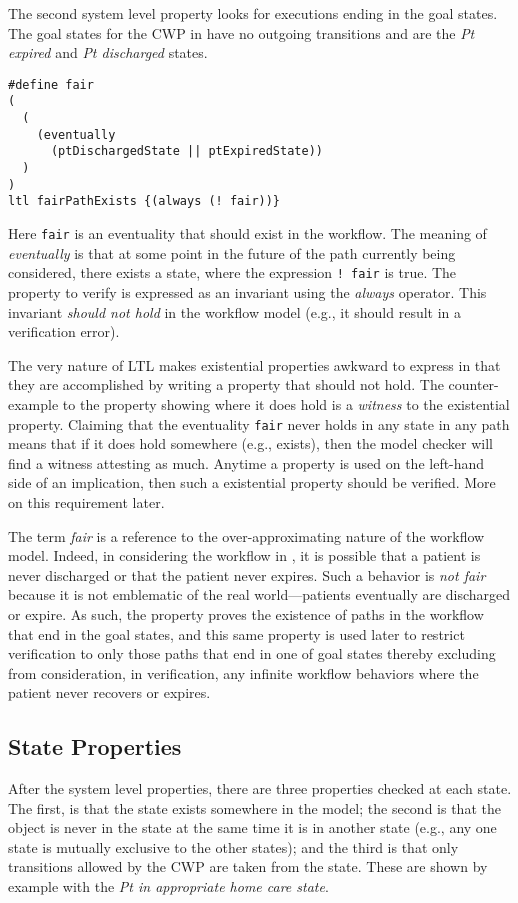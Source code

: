 The second system level property looks for executions ending in the goal states. The goal states for the CWP in  have no outgoing transitions and are the \emph{Pt expired} and \emph{Pt discharged} states.
%
{\small
\begin{lstlisting}[style=myPromela]
#define fair
(
  (
    (eventually 
      (ptDischargedState || ptExpiredState))
  )
)
ltl fairPathExists {(always (! fair))}
\end{lstlisting}
}
%
\noindent Here \texttt{fair} is an eventuality that should exist in the workflow. The meaning of \emph{eventually} is that at some point in the future of the path currently being considered, there exists a state, where the expression \texttt{! fair} is true. The property to verify is expressed as an invariant using the \emph{always} operator. This invariant \emph{should not hold} in the workflow model (e.g., it should result in a verification error). 

The very nature of LTL makes existential properties awkward to express in that they are accomplished by writing a property that should not hold. The counter-example to the property showing where it does hold is a \emph{witness} to the existential property. Claiming that the eventuality \texttt{fair} never holds in any state in any path means that if it does hold somewhere (e.g., exists), then the model checker will find a witness attesting as much. Anytime a property is used on the left-hand side of an implication, then such a existential property should be verified. More on this requirement later.

The term \emph{fair} is a reference to the over-approximating nature of the workflow model. Indeed, in considering the workflow in , it is possible that a patient is never discharged or that the patient never expires. Such a behavior is \emph{not fair} because it is not emblematic of the real world---patients eventually are discharged or expire. As such, the property proves the existence of paths in the workflow that end in the goal states, and this same property is used later to restrict verification to only those paths that end in one of goal states thereby excluding from consideration, in verification, any infinite workflow behaviors where the patient never recovers or expires.

\subsection{State Properties}
After the system level properties, there are three properties checked at each state. The first, is that the state exists somewhere in the model; the second is that the object is never in the state at the same time it is in another state (e.g., any one state is mutually exclusive to the other states); and the third is that only transitions allowed by the CWP are taken from the state. These are shown by example with the \emph{Pt in appropriate home care state}.

